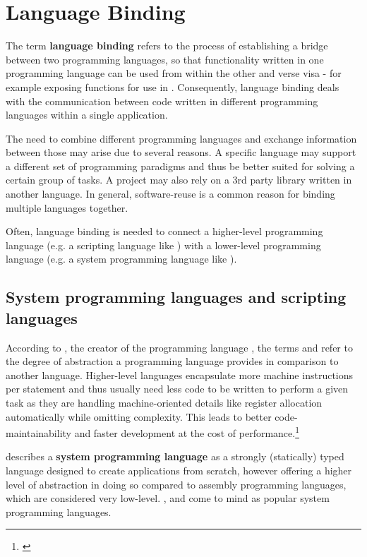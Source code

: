 \chapter{Language Binding}
\label{chap:LanguageBinding}

The term \textbf{language binding} refers to the process of establishing a bridge between two programming languages, so that functionality written in one programming language can be used from within the other and verse visa - for example exposing  functions for use in . Consequently, language binding deals with the communication between code written in different programming languages within a single application.

The need to combine different programming languages and exchange information between those may arise due to several reasons. A specific language may support a different set of programming paradigms and thus be better suited for solving a certain group of tasks. A project may also rely on a 3rd party library written in another language. In general, software-reuse is a common reason for binding multiple languages together.

Often, language binding is needed to connect a higher-level programming language (e.g. a scripting language like ) with a lower-level programming language (e.g. a system programming language like ).

\section{System programming languages and scripting languages}

According to , the creator of the programming language , the terms \textbf{} and \textbf{} refer to the degree of abstraction a programming language provides in comparison to another language. Higher-level languages encapsulate more machine instructions per statement and thus usually need less code to be written to perform a given task as they are handling machine-oriented details like register allocation automatically while omitting complexity. This leads to better code-maintainability and faster development at the cost of performance.\footnote{\citep{Ousterhout}}

 describes a \textbf{system programming language} as a strongly (statically) typed language designed to create applications from scratch, however offering a higher level of abstraction in doing so compared to assembly programming languages, which are considered very low-level. ,  and  come to mind as popular system programming languages.

